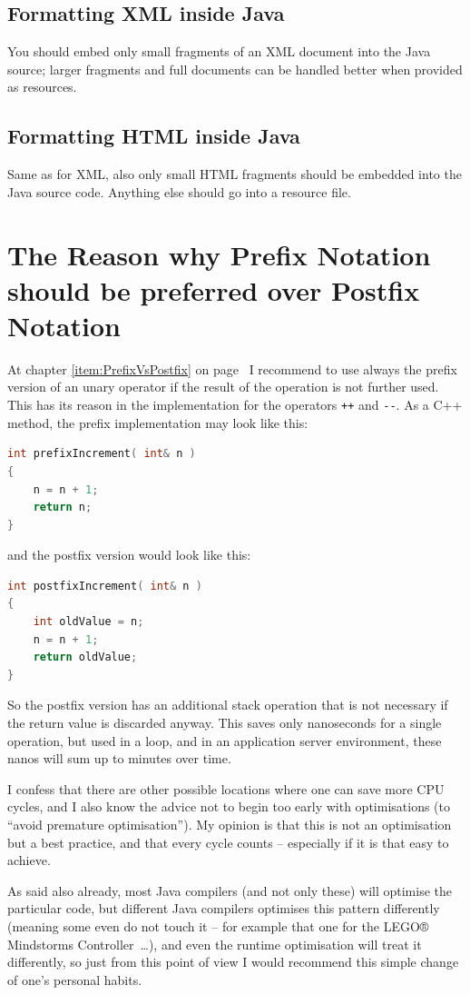 \documentclass[11pt,a4paper, titlepage, parskip=half, headsepline, footsepline, cleardoublepage=current, headheight=1cm]{scrbook}
\newcommand*{\tqvref}[1]{\hyperref[{#1}]{\ref*{#1}} on page~\pageref{#1}}
\begin{document}
\subsection{Formatting XML inside Java}\label{sec:FormattingXMLInsideJava}
You should embed only small fragments of an XML document into the Java source; larger fragments and full documents can be handled better when provided as resources.

\subsection{Formatting HTML inside Java}\label{sec:FormattingHTMLInsideJava}
Same as for XML, also only small HTML fragments should be embedded into the Java source code. Anything else should go into a resource file.

\section{The Reason why Prefix Notation should be preferred over Postfix Notation}
At chapter \tqvref{item:PrefixVsPostfix} I recommend to use always the prefix version of an unary operator if the result of the operation is not further used. This has its reason in the implementation for the operators \verb#++# and \verb#--#. As a C++ method, the prefix implementation may look like this:
\begin{lstlisting}[language=C++]
int prefixIncrement( int& n )
{
    n = n + 1;
    return n;
}
\end{lstlisting}
and the postfix version would look like this:
\begin{lstlisting}[language=C++]
int postfixIncrement( int& n )
{
    int oldValue = n;
    n = n + 1;
    return oldValue;
}
\end{lstlisting}
So the postfix version has an additional stack operation that is not necessary if the return value is discarded anyway. This saves only nanoseconds for a single operation, but used in a loop, and in an application server environment, these nanos will sum up to minutes over time.

I confess that there are other possible locations where one can save more CPU cycles, and I also know the advice not to begin too early with optimisations (to “avoid premature optimisation”). My opinion is that this is not an optimisation but a best practice, and that every cycle counts – especially if it is that easy to achieve.

As said also already, most Java compilers (and not only these) will optimise the particular code, but different Java compilers optimises this pattern differently (meaning some even do not touch it – for example that one for the LEGO® Mindstorms Controller~…), and even the runtime optimisation will treat it differently, so just from this point of view I would recommend this simple change of one's personal habits.
\end{document}

